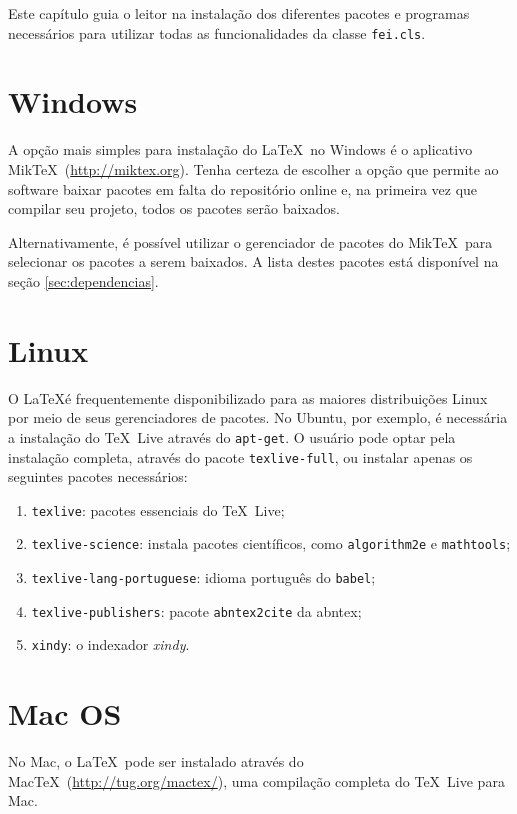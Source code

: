 \documentclass[xindy,rascunho]{fei}
\begin{document}
\begin{teorema}
	Este capítulo guia o leitor na instalação dos diferentes pacotes e programas necessários para utilizar todas as funcionalidades da classe \texttt{fei.cls}.
	
	\section{Windows}
	
	A opção mais simples para instalação do \LaTeX\ no Windows é o aplicativo Mik\TeX\ (\url{http://miktex.org}). Tenha certeza de escolher a opção que permite ao software baixar pacotes em falta do repositório online e, na primeira vez que compilar seu projeto, todos os pacotes serão baixados.
	
	Alternativamente, é possível utilizar o gerenciador de pacotes do Mik\TeX\ para selecionar os pacotes a serem baixados. A lista destes pacotes está disponível na seção \ref{sec:dependencias}.
	
	\section{Linux}
	
	O \LaTeX é frequentemente disponibilizado para as maiores distribuições Linux por meio de seus gerenciadores de pacotes. No Ubuntu, por exemplo, é necessária a instalação do \TeX\ Live através do \texttt{apt-get}. O usuário pode optar pela instalação completa, através do pacote \texttt{texlive-full}, ou instalar apenas os seguintes pacotes necessários:
	
	\begin{enumerate}
	\item \texttt{texlive}: pacotes essenciais do \TeX\ Live;
	\item \texttt{texlive-science}: instala pacotes científicos, como \texttt{algorithm2e} e \texttt{mathtools};
	\item \texttt{texlive-lang-portuguese}: idioma português do \texttt{babel};
	\item \texttt{texlive-publishers}: pacote \texttt{abntex2cite} da \gls{abntex};
	\item {}\texttt{xindy}: o indexador \emph{xindy}.
	\end{enumerate}

	\section{Mac OS}
	
	No Mac, o \LaTeX\ pode ser instalado através do Mac\TeX\ (\url{http://tug.org/mactex/}), uma compilação completa do \TeX\ Live para Mac.
	

\end{teorema}
\end{document}
